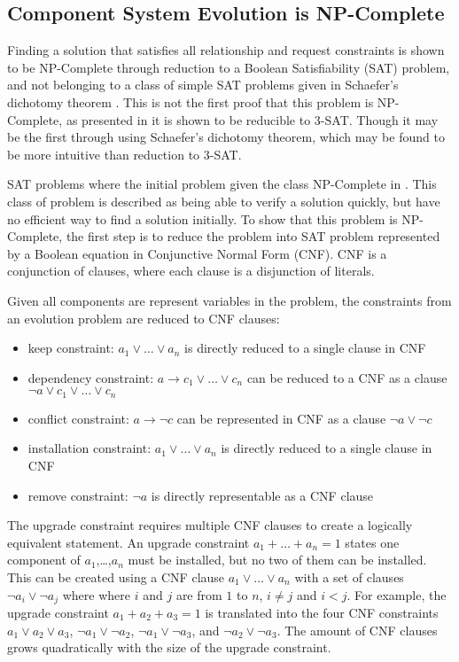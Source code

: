 \subsection{Component System Evolution is NP-Complete}
Finding a solution that satisfies all relationship and request constraints is shown to be NP-Complete through reduction to a Boolean Satisfiability (SAT) problem,
and not belonging to a class of simple SAT problems given in Schaefer's dichotomy theorem \citep{Schaefer1978}.
This is not the first proof that this problem is NP-Complete, as presented in \cite{edos2005report} it is shown to be reducible to 3-SAT. 
Though it may be the first through using Schaefer's dichotomy theorem, which may be found to be more intuitive than reduction to 3-SAT.

SAT problems where the initial problem given the class NP-Complete in \cite{cook1971}.
This class of problem is described as being able to verify a solution quickly, but have no efficient way to find a solution initially.
To show that this problem is NP-Complete, the first step is to reduce the problem into SAT problem represented by a Boolean equation in Conjunctive Normal Form (CNF).
CNF is a conjunction of clauses, where each clause is a disjunction of literals.

Given all components are represent variables in the problem, the constraints from an evolution problem are reduced to CNF clauses:
\begin{itemize}
  \item keep constraint: $a_1 \vee \ldots \vee a_n$ is directly reduced to a single clause in CNF
  \item dependency constraint: $a \rightarrow c_1 \vee \ldots \vee c_n$ can be reduced to a CNF as a clause $\neg a \vee c_1 \vee \ldots \vee c_n$
  \item conflict constraint: $a \rightarrow \neg c$ can be represented in CNF as a clause $\neg a \vee \neg c$
  \item installation constraint: $a_1 \vee \ldots \vee a_n$ is directly reduced to a single clause in CNF
  \item remove constraint: $\neg a$ is directly representable as a CNF clause
\end{itemize}

The upgrade constraint requires multiple CNF clauses to create a logically equivalent statement.
An upgrade constraint $a_1 + \ldots + a_n = 1$ states one component of $a_1$,\ldots,$a_n$ must be installed, but no two of them can be installed.
This can be created using a CNF clause $a_1 \vee \ldots \vee a_n$ with a set of clauses $\neg a_i \vee \neg a_j$ where where $i$ and $j$ are from $1$ to $n$, $i \neq j$ and $i < j$.
For example, the upgrade constraint $a_1 + a_2 + a_3 = 1$ is translated into the four CNF constraints $a_1 \vee a_2 \vee a_3$, $\neg a_1 \vee \neg a_2$, $\neg a_1 \vee \neg a_3$, and $\neg a_2 \vee \neg a_3$.
The amount of CNF clauses grows quadratically with the size of the upgrade constraint. 


